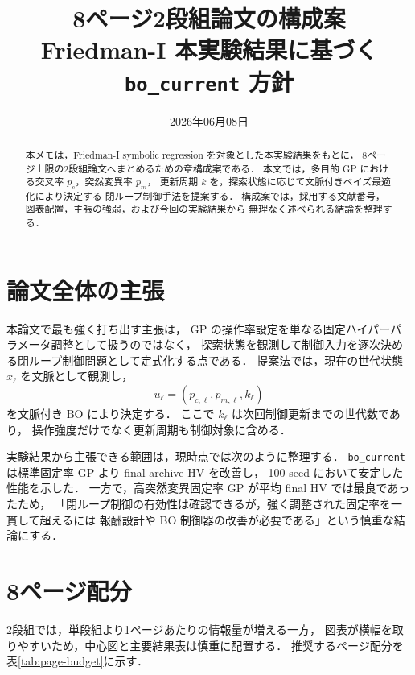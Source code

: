 \documentclass[a4paper,10pt,twocolumn]{ltjsarticle}
\title{8ページ2段組論文の構成案\\
\large Friedman-I 本実験結果に基づく \texttt{bo\_current} 方針}
\author{}
\date{2026年06月08日}
\newcommand{\HV}{\mathrm{HV}}
\newcommand{\pc}{p_c}
\newcommand{\pmut}{p_m}
\begin{document}
\maketitle

\begin{abstract}
本メモは，Friedman-I symbolic regression を対象とした本実験結果をもとに，
8ページ上限の2段組論文へまとめるための章構成案である．
本文では，多目的 GP における交叉率 \(\pc\)，突然変異率 \(\pmut\)，
更新周期 \(k\) を，探索状態に応じて文脈付きベイズ最適化により決定する
閉ループ制御手法を提案する．
構成案では，採用する文献番号，図表配置，主張の強弱，および今回の実験結果から
無理なく述べられる結論を整理する．
\end{abstract}

\section{論文全体の主張}

本論文で最も強く打ち出す主張は，
GP の操作率設定を単なる固定ハイパーパラメータ調整として扱うのではなく，
探索状態を観測して制御入力を逐次決める閉ループ制御問題として定式化する点である．
提案法では，現在の世代状態 \(x_\ell\) を文脈として観測し，
\[
  u_\ell = (p_{c,\ell},p_{m,\ell},k_\ell)
\]
を文脈付き BO により決定する．
ここで \(k_\ell\) は次回制御更新までの世代数であり，
操作強度だけでなく更新周期も制御対象に含める．

実験結果から主張できる範囲は，現時点では次のように整理する．
\texttt{bo\_current} は標準固定率 GP より final archive \(\HV\) を改善し，
100 seed において安定した性能を示した．
一方で，高突然変異固定率 GP が平均 final \(\HV\) では最良であったため，
「閉ループ制御の有効性は確認できるが，強く調整された固定率を一貫して超えるには
報酬設計や BO 制御器の改善が必要である」という慎重な結論にする．

\section{8ページ配分}

2段組では，単段組より1ページあたりの情報量が増える一方，
図表が横幅を取りやすいため，中心図と主要結果表は慎重に配置する．
推奨するページ配分を表\ref{tab:page-budget}に示す．
\end{document}
